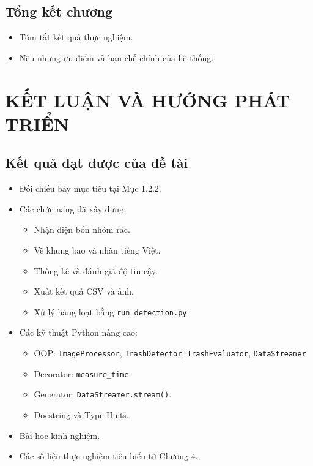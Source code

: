 \documentclass[a4paper,13pt]{extarticle}
\begin{document}
\subsection {Tổng kết chương}
\begin{itemize}
    \item Tóm tắt kết quả thực nghiệm.
    \item Nêu những ưu điểm và hạn chế chính của hệ thống.
\end{itemize}

\section{KẾT LUẬN VÀ HƯỚNG PHÁT TRIỂN}

\subsection{ Kết quả đạt được của đề tài}
\begin{itemize}
    \item Đối chiếu bảy mục tiêu tại Mục 1.2.2.
    \item Các chức năng đã xây dựng:
    \begin{itemize}
        \item Nhận diện bốn nhóm rác.
        \item Vẽ khung bao và nhãn tiếng Việt.
        \item Thống kê và đánh giá độ tin cậy.
        \item Xuất kết quả CSV và ảnh.
        \item Xử lý hàng loạt bằng \texttt{run\_detection.py}.
    \end{itemize}
    \item Các kỹ thuật Python nâng cao:
    \begin{itemize}
        \item OOP: \texttt{ImageProcessor}, \texttt{TrashDetector}, \texttt{TrashEvaluator}, \texttt{DataStreamer}.
        \item Decorator: \texttt{measure\_time}.
        \item Generator: \texttt{DataStreamer.stream()}.
        \item Docstring và Type Hints.
    \end{itemize}
    \item Bài học kinh nghiệm.
    \item Các số liệu thực nghiệm tiêu biểu từ Chương 4.
\end{itemize}
\end{document}
